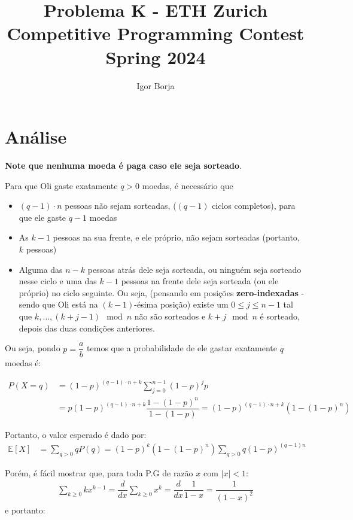 \documentclass{article}
\author{Igor Borja}
\date{}
\title{Problema K - ETH Zurich Competitive Programming Contest Spring 2024}
\begin{document}
    \maketitle

    \section{Análise}

    \textbf{Note que nenhuma moeda é paga caso ele seja sorteado}.

    Para que Oli gaste exatamente \(q > 0\) moedas, é necessário que
    \begin{itemize}
        \item  \((q - 1) \cdot n\) pessoas não sejam sorteadas, (\((q - 1)\) ciclos completos), para que ele gaste \(q - 1\) moedas
        \item As \(k - 1\) pessoas na sua frente, e ele próprio, não sejam sorteadas (portanto, \(k\) pessoas)
        \item Alguma das \(n - k\) pessoas atrás dele seja sorteada, ou ninguém seja sorteado nesse ciclo e uma das \(k - 1\) pessoas na frente dele seja sorteada (ou ele próprio) no ciclo seguinte. Ou seja, (pensando em posições \textbf{zero-indexadas} - sendo que Oli está na \((k - 1)\)-ésima posição) existe um \(0 \leq j \leq n - 1\) tal que \(k, \dotsc, (k + j - 1) \mod n\) não são sorteados e \(k + j \mod n\) é sorteado, depois das duas condições anteriores.
    \end{itemize}

    Ou seja, pondo \(p = \dfrac{a}{b}\) temos que a probabilidade de ele gastar exatamente \(q\) moedas é:

    \begin{align*}
        P(X = q)
        &= \left(1 - p\right)^{(q - 1) \cdot n + k}\sum_{j = 0}^{n - 1}\left(1 - p\right)^{j}p
        \\
        &= p\left(1 - p\right)^{(q - 1)\cdot n + k} \dfrac{1 - \left(1 - p\right)^{n}}{1 - \left(1 - p\right)}
        = \left(1 - p\right)^{(q - 1)\cdot n + k}(1 - (1 - p)^n)
    \end{align*}

    Portanto, o valor esperado é dado por:
    \begin{align*}
        \mathbb{E}[X] &= \sum_{q > 0}q P(q) 
        = \left(1 - p\right)^{k}(1 - (1 - p)^n)\sum_{q > 0}q\left(1 - p\right)^{(q - 1)n}
    \end{align*}

    Porém, é fácil mostrar que, para toda P.G de razão \(x\) com \(|x| < 1\):
    \begin{align*}
        \sum_{k \geq 0}kx^{k - 1} = \dfrac{d}{dx}\sum_{k \geq 0}x^k = \dfrac{d}{dx}\dfrac{1}{1 - x} = \dfrac{1}{(1 - x)^2}
    \end{align*}
    e portanto:
\end{document}
